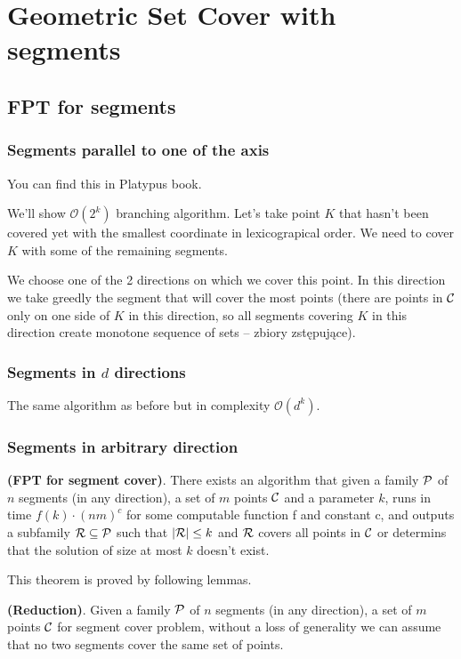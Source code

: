 \chapter{Geometric Set Cover with segments}

\section{FPT for segments}
\subsection{Segments parallel to one of the axis}
You can find this in Platypus book.

We'll show $\mathcal{O}(2^k)$ branching algorithm.
Let's take point $K$ that hasn't been covered yet with
the smallest coordinate in lexicograpical order.
We need to cover $K$ with some of the remaining segments.

We choose one of the 2 directions on which we cover this point.
In this direction we take greedly the segment that will cover
the most points (there are points in $\mathcal{C}$ only on
one side of $K$ in this direction, so all
segments covering $K$ in this direction create monotone sequence
of sets -- zbiory zstępujące).

\subsection{Segments in $d$ directions}
The same algorithm as before but in complexity $\mathcal{O}(d^k)$.

\subsection{Segments in arbitrary direction}
\begin{tw}{
	\label{segment_cover_fpt}
	\textbf{(FPT for segment cover)}.
	There exists an algorithm that given a family $\mathcal{P}$ of
	$n$ segments (in any direction),
	a set of $m$ points $\mathcal{C}$
	and a parameter $k$,
	runs in time $f(k) \cdot (nm)^c$ for some computable function f and constant c,
	and outputs a subfamily $\mathcal{R} \subseteq \mathcal{P}$
	such that $|\mathcal{R}| \le k$ and $\mathcal{R}$ covers all points in $\mathcal{C}$
	or determins that the solution of size at most $k$ doesn't exist.
}\end{tw}

This theorem is proved by following lemmas.

\begin{lemma}
   \label{fpt_reduction}
   \textbf{(Reduction)}.
   Given a family $\mathcal{P}$ of
	$n$ segments (in any direction),
	a set of $m$ points $\mathcal{C}$
	for segment cover problem,
   without a loss of generality we can assume that
   no two segments cover the same set of points.
\end{lemma}   
   
